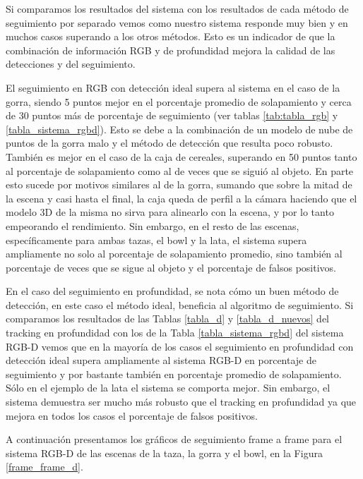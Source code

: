 Si comparamos los resultados del sistema con los resultados de cada método de seguimiento por separado vemos como nuestro sistema responde muy bien y en muchos casos superando a los otros métodos. Esto es un indicador de que la combinación de información RGB y de profundidad mejora la calidad de las detecciones y del seguimiento.

El seguimiento en RGB con detección ideal supera al sistema en el caso de la gorra, siendo 5 puntos mejor en el porcentaje promedio de solapamiento y cerca de 30 puntos más de porcentaje de seguimiento (ver tablas \ref{tab:tabla_rgb} y \ref{tabla_sistema_rgbd}). Esto se debe a la combinación de un modelo de nube de puntos de la gorra malo y el método de detección que resulta poco robusto. También es mejor en el caso de la caja de cereales, superando en 50 puntos tanto al porcentaje de solapamiento como al de veces que se siguió al objeto. En parte esto sucede por motivos similares al de la gorra, sumando que sobre la mitad de la escena y casi hasta el final, la caja queda de perfil a la cámara haciendo que el modelo 3D de la misma no sirva para alinearlo con la escena, y por lo tanto empeorando el rendimiento. Sin embargo, en el resto de las escenas, específicamente para ambas tazas, el bowl y la lata, el sistema supera ampliamente no solo al porcentaje de solapamiento promedio, sino también al porcentaje de veces que se sigue al objeto y el porcentaje de falsos positivos.

En el caso del seguimiento en profundidad, se nota cómo un buen método de detección, en este caso el método ideal, beneficia al algoritmo de seguimiento. Si comparamos los resultados de las Tablas \ref{tabla_d} y \ref{tabla_d_nuevos} del tracking en profundidad con los de la Tabla \ref{tabla_sistema_rgbd} del sistema RGB-D vemos que en la mayoría de los casos el seguimiento en profundidad con detección ideal supera ampliamente al sistema RGB-D en porcentaje de seguimiento y por bastante también en porcentaje promedio de solapamiento. Sólo en el ejemplo de la lata el sistema se comporta mejor. Sin embargo, el sistema demuestra ser mucho más robusto que el tracking en profundidad ya que mejora en todos los casos el porcentaje de falsos positivos.

A continuación presentamos los gráficos de seguimiento frame a frame para el sistema RGB-D de las escenas de la taza, la gorra y el bowl, en la Figura \ref{frame_frame_d}.

